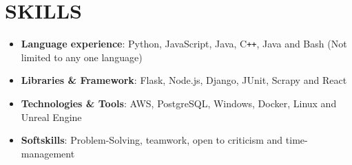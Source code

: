 \documentclass[12pt]{extarticle}
\begin{document}
\section*{SKILLS}
\begin{itemize}
  \item \textbf{Language experience}: Python, JavaScript, Java, C\texttt{++}, Java and Bash (Not limited to any one language)
  \item \textbf{Libraries \& Framework}: Flask, Node.js, Django, JUnit, Scrapy and React
  \item \textbf{Technologies \& Tools}: AWS, PostgreSQL, Windows, Docker, Linux and Unreal Engine
  \item \textbf{Softskills}: Problem-Solving, teamwork, open to criticism and time-management
\end{itemize}
\end{document}
